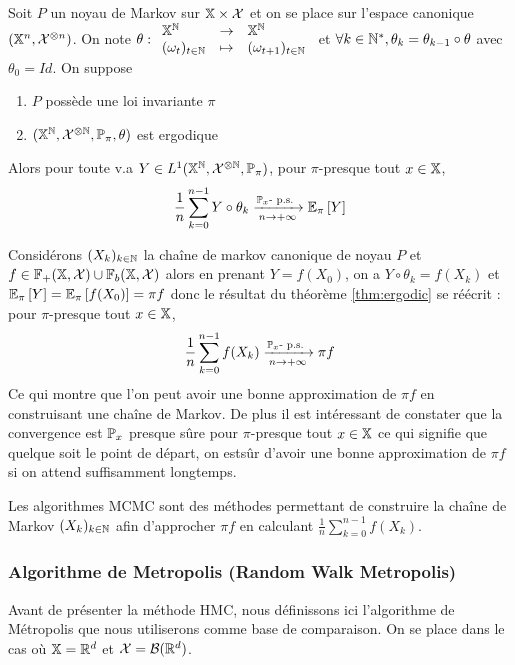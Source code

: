 \documentclass[10pt,a4paper]{article}
\begin{document}
\begin{Thm}\label{thm:ergodic}
  Soit $P$ un noyau de Markov sur $\mathbb{X} \times \mathcal{X}$ et on se place sur l'espace canonique $(\mathbb{X}^n, \mathcal{X}^{\otimes n})$. On note $ \theta : { \begin{array}{lcl}  \mathbb{X}^{\mathbb{N}} &\to& \mathbb{X}^{\mathbb{N}} \\ (\omega_t)_{t\in \mathbb{N}} &\mapsto& (\omega_{t+1})_{t \in \mathbb{N}} \end{array} }$ et  $\forall k \in \mathbb{N}^*, \theta_k = \theta_{k-1} \circ \theta$ avec $\theta_0 = Id$. On suppose
  \begin{enumerate}
  \item $P$ possède une loi invariante $\pi$
  \item $(\xset^\nset, \calX^{\otimes \nset}, \PP_\pi, \theta)$ est ergodique
  \end{enumerate}
  Alors pour toute v.a $Y \in L^1(\xset^\nset, \calX^{\otimes \nset}, \PP_\pi)$, pour $\pi$-presque tout $x \in \mathbb{X}$, 
$$
  \frac{1}{n} \sum_{k=0}^{n-1} Y \circ \theta_k \xrightarrow[n \to +\infty]{\PP_x\text{-}\ps} \EE{\pi}[Y]
  $$
\end{Thm}

\begin{Rque}
  Considérons $(X_k)_{k \in \mathbb{N}}$ la chaîne de markov canonique de noyau $P$ et $f \in \mathbb{F}_+(\mathbb{X}, \mathcal{X}) \cup \mathbb{F}_b(\mathbb{X}, \mathcal{X})$ alors en prenant $Y = f(X_0)$, on a $Y \circ \theta_k = f(X_k)$ et $\EE{\pi}[Y] = \EE{\pi}[f(X_0)] = \pi f$ donc le résultat du théorème \ref{thm:ergodic} se réécrit : pour $\pi$-presque tout $x \in \mathbb{X}$, 
$$
  \frac{1}{n} \sum_{k=0}^{n-1} f(X_k) \xrightarrow[n \to +\infty]{\PP_x\text{-}\ps} \pi f
  $$
  Ce qui montre que l'on peut avoir une bonne approximation de $\pi f$ en construisant une chaîne de Markov. De plus il est intéressant de constater que la convergence est $\PP_x$ presque sûre pour $\pi$-presque tout $x \in \mathbb{X}$ ce qui signifie que quelque soit le point de départ, on estsûr d'avoir une bonne approximation de $\pi f$ si on attend suffisamment longtemps.
\end{Rque}
Les algorithmes MCMC sont des méthodes permettant de construire la chaîne de Markov $(X_k)_{k \in \mathbb{N}}$ afin d'approcher $\pi f$ en calculant $\frac{1}{n} \sum_{k=0}^{n-1} f(X_k)$. 

\subsubsection{Algorithme de Metropolis (Random Walk Metropolis)}
Avant de présenter la méthode HMC, nous définissons ici l'algorithme de Métropolis que nous utiliserons comme base de comparaison. On se place dans le cas où $\mathbb{X} = \mathbb{R}^d$ et $\mathcal{X} = \mathcal{B}(\mathbb{R}^d)$. 
\end{document}
